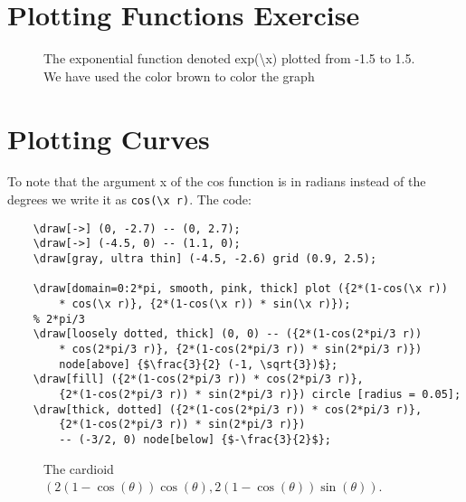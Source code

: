 \documentclass[12pt,titlepage]{article}
\begin{document}
\newpage
\section{Plotting Functions Exercise}

\begin{figure}[h]
    \centering
    \caption{The exponential function denoted exp(\textbackslash x) plotted from -1.5 to 1.5. We have used the color brown to color the graph}
\end{figure}

\newpage
\section{Plotting Curves}
To note that the argument x of the cos function is in radians instead of the degrees we write it as \verb|cos(\x r)|. The code:
\begin{verbatim}
    \draw[->] (0, -2.7) -- (0, 2.7);
    \draw[->] (-4.5, 0) -- (1.1, 0);
    \draw[gray, ultra thin] (-4.5, -2.6) grid (0.9, 2.5);

    \draw[domain=0:2*pi, smooth, pink, thick] plot ({2*(1-cos(\x r))
        * cos(\x r)}, {2*(1-cos(\x r)) * sin(\x r)});
    % 2*pi/3
    \draw[loosely dotted, thick] (0, 0) -- ({2*(1-cos(2*pi/3 r))
        * cos(2*pi/3 r)}, {2*(1-cos(2*pi/3 r)) * sin(2*pi/3 r)})
        node[above] {$\frac{3}{2} (-1, \sqrt{3})$};
    \draw[fill] ({2*(1-cos(2*pi/3 r)) * cos(2*pi/3 r)},
        {2*(1-cos(2*pi/3 r)) * sin(2*pi/3 r)}) circle [radius = 0.05];
    \draw[thick, dotted] ({2*(1-cos(2*pi/3 r)) * cos(2*pi/3 r)},
        {2*(1-cos(2*pi/3 r)) * sin(2*pi/3 r)})
        -- (-3/2, 0) node[below] {$-\frac{3}{2}$};
\end{verbatim}
\begin{figure}[h]
    \centering
    \caption{The cardioid $\left(2(1-\cos(\theta))\cos(\theta),{2(1-\cos(\theta))\sin(\theta)}\right)$.}
\end{figure}
\end{document}
